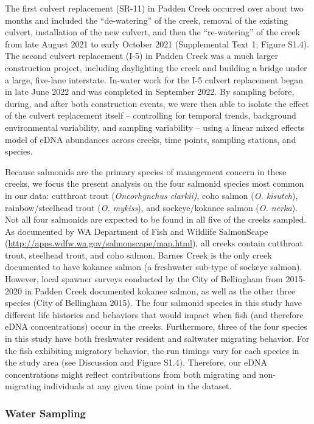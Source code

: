 \documentclass[
]{article}
\begin{document}
The first culvert replacement (SR-11) in Padden Creek occurred over
about two months and included the ``de-watering'' of the creek, removal
of the existing culvert, installation of the new culvert, and then the
``re-watering'' of the creek from late August 2021 to early October 2021
(Supplemental Text 1; Figure S1.4). The second culvert replacement (I-5)
in Padden Creek was a much larger construction project, including
daylighting the creek and building a bridge under a large, five-lane
interstate. In-water work for the I-5 culvert replacement began in late
June 2022 and was completed in September 2022. By sampling before,
during, and after both construction events, we were then able to isolate
the effect of the culvert replacement itself -- controlling for temporal
trends, background environmental variability, and sampling variability
-- using a linear mixed effects model of eDNA abundances across creeks,
time points, sampling stations, and species.

Because salmonids are the primary species of management concern in these
creeks, we focus the present analysis on the four salmonid species most
common in our data: cutthroat trout (\emph{Oncorhynchus clarkii)}, coho
salmon (\emph{O. kisutch}), rainbow/steelhead trout (\emph{O. mykiss}),
and sockeye/kokanee salmon (\emph{O. nerka}). Not all four salmonids are
expected to be found in all five of the creeks sampled. As documented by
WA Department of Fish and Wildlife SalmonScape
(\url{http://apps.wdfw.wa.gov/salmonscape/map.html}), all creeks contain
cutthroat trout, steelhead trout, and coho salmon. Barnes Creek is the
only creek documented to have kokanee salmon (a freshwater sub-type of
sockeye salmon). However, local spawner surveys conducted by the City of
Bellingham from 2015-2020 in Padden Creek documented kokanee salmon, as
well as the other three species (City of Bellingham 2015). The four
salmonid species in this study have different life histories and
behaviors that would impact when fish (and therefore eDNA
concentrations) occur in the creeks. Furthermore, three of the four
species in this study have both freshwater resident and saltwater
migrating behavior. For the fish exhibiting migratory behavior, the run
timings vary for each species in the study area (see Discussion and
Figure S1.4). Therefore, our eDNA concentrations might reflect
contributions from both migrating and non-migrating individuals at any
given time point in the dataset.

\hypertarget{water-sampling}{%
\subsubsection{Water Sampling}\label{water-sampling}}
\end{document}

